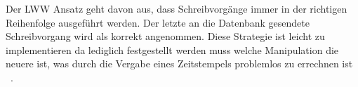 Der \gls{LWW} Ansatz geht davon aus, dass Schreibvorgänge immer in der richtigen Reihenfolge ausgeführt werden. Der letzte an die Datenbank gesendete Schreibvorgang wird als korrekt angenommen.
Diese Strategie ist leicht zu implementieren da lediglich festgestellt werden muss welche Manipulation die neuere ist, was durch die Vergabe eines Zeitstempels problemlos zu errechnen ist ~\cite{lww}.
